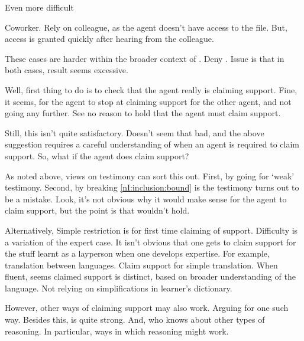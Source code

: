 \begin{note}
  Even more difficult
\end{note}

\begin{note}
  Coworker.
  Rely on colleague, as the agent doesn't have access to the file.
  But, access is granted quickly after hearing from the colleague.
\end{note}

\begin{note}
  These cases are harder within the broader context of \nI{}.
  Deny \RBV{}.
  Issue is that in both cases, result seems excessive.

  Well, first thing to do is to check that the agent really is claiming support.
  Fine, it seems, for the agent to stop at claiming support for the other agent, and not going any further.
  See no reason to hold that the agent must claim support.

  Still, this isn't quite satisfactory.
  Doesn't seem that bad, and the above suggestion requires a careful understanding of when an agent is required to claim support.
  So, what if the agent does claim support?

  As noted above, views on testimony can sort this out.
  First, by going for `weak' testimony.
  Second, by breaking \ref{nI:inclusion:bound} is the testimony turns out to be a mistake.
  Look, it's not obvious why it would make sense for the agent to claim support, but the point is that \nI{} wouldn't hold.

  Alternatively, Simple restriction is for first time claiming of support.
  Difficulty is a variation of the expert case.
  It isn't obvious that one gets to claim support for the stuff learnt as a layperson when one develops expertise.
  For example, translation between languages.
  Claim support for simple translation.
  When fluent, seems claimed support is distinct, based on broader understanding of the language.
  Not relying on simplifications in learner's dictionary.

  However, other ways of claiming support may also work.
  Arguing for one such way.
  Besides this, \RBV{} is quite strong.
  And, who knows about other types of reasoning.
  In particular, ways in which reasoning \adA{} might work.
\end{note}

